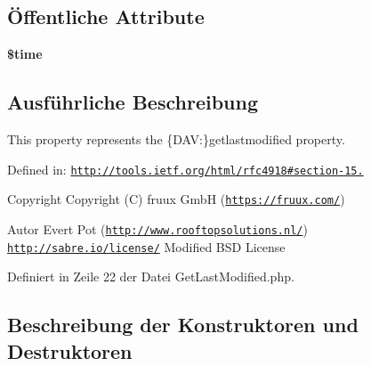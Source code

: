 \subsection*{Öffentliche Attribute}
\begin{DoxyCompactItemize}
\item 
\mbox{\label{class_sabre_1_1_d_a_v_1_1_xml_1_1_property_1_1_get_last_modified_a4f651b9e246d97d8b1dd01022259b6d8}} 
{\bfseries \$time}
\end{DoxyCompactItemize}


\subsection{Ausführliche Beschreibung}
This property represents the \{D\+AV\+:\}getlastmodified property.

Defined in\+: \href{http://tools.ietf.org/html/rfc4918#section-15.7}{\tt http\+://tools.\+ietf.\+org/html/rfc4918\#section-\/15.}

\begin{DoxyCopyright}{Copyright}
Copyright (C) fruux GmbH (\href{https://fruux.com/}{\tt https\+://fruux.\+com/}) 
\end{DoxyCopyright}
\begin{DoxyAuthor}{Autor}
Evert Pot (\href{http://www.rooftopsolutions.nl/}{\tt http\+://www.\+rooftopsolutions.\+nl/})  \href{http://sabre.io/license/}{\tt http\+://sabre.\+io/license/} Modified B\+SD License 
\end{DoxyAuthor}


Definiert in Zeile 22 der Datei Get\+Last\+Modified.\+php.



\subsection{Beschreibung der Konstruktoren und Destruktoren}
\mbox{\label{class_sabre_1_1_d_a_v_1_1_xml_1_1_property_1_1_get_last_modified_a823274634fbc829cd388091994bc0060}} 
